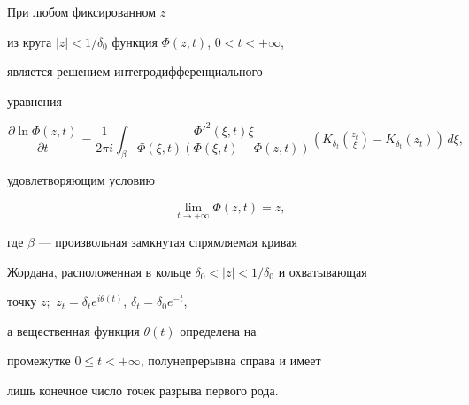 \begin{thm}


При любом фиксированном $z$ 


из круга $|z|<1/\delta_{0}$ функция $\Phi(z,t)$, $0<t<+\infty$,


является решением интегродифференциального


уравнения


\begin{equation}


\frac{\partial\ln\Phi(z,t)}{\partial t}=


\frac{1}{2\pi i}


\int_{\beta}


\frac{{\Phi'}^{2}(\xi,t)\xi}{\Phi(\xi,t)(\Phi(\xi,t)-\Phi(z,t))}


(K_{\delta_{t}}(\tfrac{z_{t}}{\xi})-K_{\delta_{t}}(z_{t}))\,d\xi,


\end{equation}


удовлетворяющим условию


\begin{equation}


\lim_{t\to+\infty}\Phi(z,t)=z,


\end{equation}


где $\beta$ --- произвольная замкнутая спрямляемая кривая


Жордана, расположенная в кольце $\delta_{0}<|z|<1/\delta_{0}$ и охватывающая


точку $z;$ $z_{t}=\delta_{t}e^{i\theta(t)}$, $\delta_{t}=\delta_{0}e^{-t}$,


а вещественная функция $\theta(t)$ определена на


промежутке $0\le t<+\infty$, полунепрерывна справа и имеет


лишь конечное число точек разрыва первого рода. 


\end{thm}





